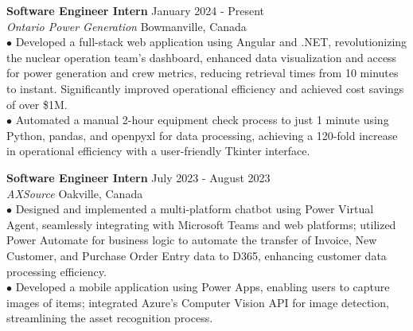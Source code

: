 \documentclass[letterpaper,12pt]{article}
\begin{document}
\textbf{Software Engineer Intern} \hfill January 2024 - Present \\
\textit{Ontario Power Generation} \hfill Bowmanville, Canada
\vspace{0.25cm} \\
\hspace{0.1cm} $\bullet$ \hspace{0.21em}Developed a full-stack web application using Angular and .NET, revolutionizing the nuclear operation team's dashboard, enhanced data visualization and access for power generation and crew metrics, reducing retrieval times from 10 minutes to instant. Significantly improved operational efficiency and achieved cost savings of over \$1M.\\ 
\hspace{0.1cm} $\bullet$ \hspace{0.2em}Automated a manual 2-hour equipment check process to just 1 minute using Python, pandas, and openpyxl for data processing, achieving a 120-fold increase in operational efficiency with a user-friendly Tkinter interface.

\textbf{Software Engineer Intern}  \hfill   July 2023 - August 2023 \\
\textit{AXSource} \hfill Oakville, Canada
\vspace{0.3cm}  
\\\hspace{0.1cm} $\bullet$ \hspace{0.3em}Designed and implemented a multi-platform chatbot using Power Virtual Agent, seamlessly integrating with Microsoft Teams and web platforms; utilized Power Automate for business logic to automate the transfer of Invoice, New Customer, and Purchase Order Entry data to D365, enhancing customer data processing efficiency.\\
\hspace{0.1cm} $\bullet$ \hspace{0.35em}Developed a mobile application using Power Apps, enabling users to capture images of items; integrated Azure's Computer Vision API for image detection, streamlining the asset recognition process. 
\end{document}
